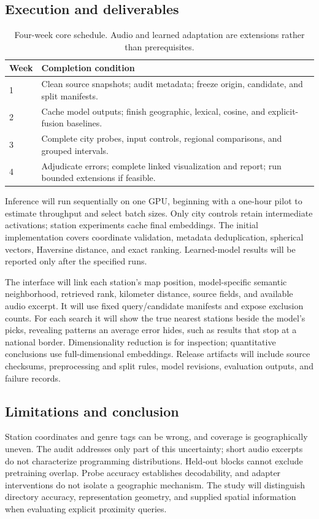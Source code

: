 \documentclass[10pt]{article}
\begin{document}
\subsection{Execution and deliverables}
\begin{table}[H]
\centering
\caption{Four-week core schedule. Audio and learned adaptation are extensions rather than prerequisites.}
\begin{tabularx}{\linewidth}{@{}lX@{}}
\toprule
Week & Completion condition\\
\midrule
1 & Clean source snapshots; audit metadata; freeze origin, candidate, and split manifests.\\
2 & Cache model outputs; finish geographic, lexical, cosine, and explicit-fusion baselines.\\
3 & Complete city probes, input controls, regional comparisons, and grouped intervals.\\
4 & Adjudicate errors; complete linked visualization and report; run bounded extensions if feasible.\\
\bottomrule
\end{tabularx}
\end{table}

Inference will run sequentially on one GPU, beginning with a one-hour pilot to estimate throughput and select batch sizes. Only city controls retain intermediate activations; station experiments cache final embeddings. The initial implementation covers coordinate validation, metadata deduplication, spherical vectors, Haversine distance, and exact ranking. Learned-model results will be reported only after the specified runs.

The interface will link each station's map position, model-specific semantic neighborhood, retrieved rank, kilometer distance, source fields, and available audio excerpt. It will use fixed query/candidate manifests and expose exclusion counts. For each search it will show the true nearest stations beside the model's picks, revealing patterns an average error hides, such as results that stop at a national border. Dimensionality reduction is for inspection; quantitative conclusions use full-dimensional embeddings. Release artifacts will include source checksums, preprocessing and split rules, model revisions, evaluation outputs, and failure records.

\subsection{Limitations and conclusion}
Station coordinates and genre tags can be wrong, and coverage is geographically uneven. The audit addresses only part of this uncertainty; short audio excerpts do not characterize programming distributions. Held-out blocks cannot exclude pretraining overlap. Probe accuracy establishes decodability, and adapter interventions do not isolate a geographic mechanism. The study will distinguish directory accuracy, representation geometry, and supplied spatial information when evaluating explicit proximity queries.



\end{document}
